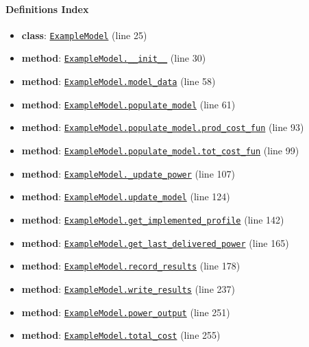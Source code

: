 \documentclass[11pt]{report}
\begin{document}
\paragraph{Definitions Index}
\begin{itemize}[leftmargin=*]
  \item \textbf{class}: \hyperref[def:tests-util.py:ExampleModel:L25]{\texttt{ExampleModel}} (line 25)
  \item \textbf{method}: \hyperref[def:tests-util.py:ExampleModel.__init__:L30]{\texttt{ExampleModel.\_\_init\_\_}} (line 30)
  \item \textbf{method}: \hyperref[def:tests-util.py:ExampleModel.model_data:L58]{\texttt{ExampleModel.model\_data}} (line 58)
  \item \textbf{method}: \hyperref[def:tests-util.py:ExampleModel.populate_model:L61]{\texttt{ExampleModel.populate\_model}} (line 61)
  \item \textbf{method}: \hyperref[def:tests-util.py:ExampleModel.populate_model.prod_cost_fun:L93]{\texttt{ExampleModel.populate\_model.prod\_cost\_fun}} (line 93)
  \item \textbf{method}: \hyperref[def:tests-util.py:ExampleModel.populate_model.tot_cost_fun:L99]{\texttt{ExampleModel.populate\_model.tot\_cost\_fun}} (line 99)
  \item \textbf{method}: \hyperref[def:tests-util.py:ExampleModel._update_power:L107]{\texttt{ExampleModel.\_update\_power}} (line 107)
  \item \textbf{method}: \hyperref[def:tests-util.py:ExampleModel.update_model:L124]{\texttt{ExampleModel.update\_model}} (line 124)
  \item \textbf{method}: \hyperref[def:tests-util.py:ExampleModel.get_implemented_profile:L142]{\texttt{ExampleModel.get\_implemented\_profile}} (line 142)
  \item \textbf{method}: \hyperref[def:tests-util.py:ExampleModel.get_last_delivered_power:L165]{\texttt{ExampleModel.get\_last\_delivered\_power}} (line 165)
  \item \textbf{method}: \hyperref[def:tests-util.py:ExampleModel.record_results:L178]{\texttt{ExampleModel.record\_results}} (line 178)
  \item \textbf{method}: \hyperref[def:tests-util.py:ExampleModel.write_results:L237]{\texttt{ExampleModel.write\_results}} (line 237)
  \item \textbf{method}: \hyperref[def:tests-util.py:ExampleModel.power_output:L251]{\texttt{ExampleModel.power\_output}} (line 251)
  \item \textbf{method}: \hyperref[def:tests-util.py:ExampleModel.total_cost:L255]{\texttt{ExampleModel.total\_cost}} (line 255)

\end{itemize}
\end{document}
